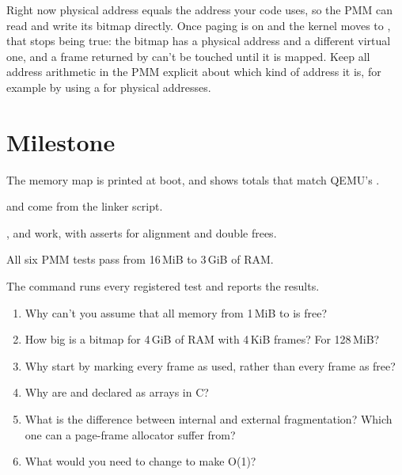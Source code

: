 \documentclass[11pt,a4paper]{article}
\begin{document}
\begin{warnbox}
Right now physical address equals the address your code uses, so the PMM can read and write its bitmap directly.
Once paging is on and the kernel moves to , that stops being true: the bitmap has a physical address
and a different virtual one, and a frame returned by  can't be touched until it is mapped.
Keep all address arithmetic in the PMM explicit about which kind of address it is, for example by using a
 for physical addresses.
\end{warnbox}

\section{Milestone}

\begin{milestonebox}
\begin{checklist}
  \item The memory map is printed at boot, and  shows totals that match QEMU's .
  \item {} and  come from the linker script.
  \item {},  and  work, with asserts for alignment and double frees.
  \item All six PMM tests pass from 16\,MiB to 3\,GiB of RAM.
  \item The  command runs every registered test and reports the results.
\end{checklist}
\end{milestonebox}

\begin{questionbox}
\begin{enumerate}
  \item Why can't you assume that all memory from 1\,MiB to  is free?
  \item How big is a bitmap for 4\,GiB of RAM with 4\,KiB frames? For 128\,MiB?
  \item Why start by marking every frame as used, rather than every frame as free?
  \item Why are  and  declared as arrays in C?
  \item What is the difference between internal and external fragmentation? Which one can a page-frame allocator suffer from?
  \item What would you need to change to make  O(1)?
\end{enumerate}
\end{questionbox}
\end{document}
